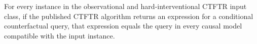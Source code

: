 For every instance in the observational and hard-interventional CTFTR input class, if the published CTFTR algorithm returns an expression for a conditional counterfactual query, that expression equals the query in every causal model compatible with the input instance.